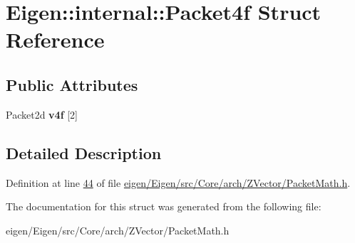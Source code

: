\hypertarget{struct_eigen_1_1internal_1_1_packet4f}{}\section{Eigen\+:\+:internal\+:\+:Packet4f Struct Reference}
\label{struct_eigen_1_1internal_1_1_packet4f}
\subsection*{Public Attributes}
\begin{DoxyCompactItemize}
\item 
\mbox{\label{struct_eigen_1_1internal_1_1_packet4f_ac6a639ca260c26850524f1eddcb1ddc9}} 
Packet2d {\bfseries v4f} \mbox{[}2\mbox{]}
\end{DoxyCompactItemize}


\subsection{Detailed Description}


Definition at line \hyperlink{eigen_2_eigen_2src_2_core_2arch_2_z_vector_2_packet_math_8h_source_l00044}{44} of file \hyperlink{eigen_2_eigen_2src_2_core_2arch_2_z_vector_2_packet_math_8h_source}{eigen/\+Eigen/src/\+Core/arch/\+Z\+Vector/\+Packet\+Math.\+h}.



The documentation for this struct was generated from the following file\+:\begin{DoxyCompactItemize}
\item 
eigen/\+Eigen/src/\+Core/arch/\+Z\+Vector/\+Packet\+Math.\+h\end{DoxyCompactItemize}
